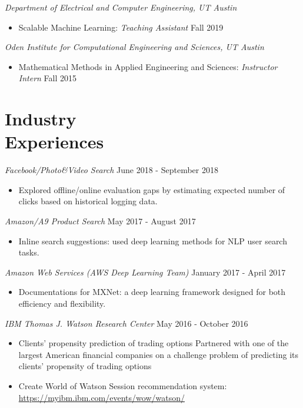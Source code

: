 \documentclass[margin, 10pt]{res} %
\begin{document}
\begin{resume}
{\sl Department of Electrical and Computer Engineering, UT Austin} 
\begin{itemize}
  \item Scalable Machine Learning: {\sl Teaching Assistant} \hfill Fall 2019
  \end{itemize}

{\sl Oden Institute for Computational Engineering and Sciences, UT Austin} 
\begin{itemize}
  \item Mathematical Methods in Applied Engineering and Sciences: {\sl Instructor Intern} \hfill Fall 2015
\end{itemize}


\section{Industry\\Experiences}

{\sl Facebook/Photo\&Video Search} \hfill June 2018 - September 2018

\begin{itemize}
	\item  Explored offline/online evaluation gaps by estimating expected number of clicks based on historical logging data.
\end{itemize}

{\sl Amazon/A9 Product Search} \hfill May 2017 - August 2017
\begin{itemize}
	\item Inline search suggestions: used deep learning methods for NLP user search tasks.
\end{itemize}

{\sl Amazon Web Services (AWS Deep Learning Team)} \hfill January 2017 - April 2017
\begin{itemize}
	\item Documentations for MXNet: a deep learning framework designed for 
	both efficiency and flexibility.
\end{itemize}

{\sl IBM Thomas J. Watson Research Center} \hfill May 2016 - October 2016
\begin{itemize}
	\item  Clients' propensity prediction of trading options
	Partnered with one of the largest American financial companies on a challenge problem of predicting its clients' propensity of trading options
	\item Create World of Watson Session recommendation system:\\
	\url{https://myibm.ibm.com/events/wow/watson/}
\end{itemize} 




\end{resume}
\end{document}
